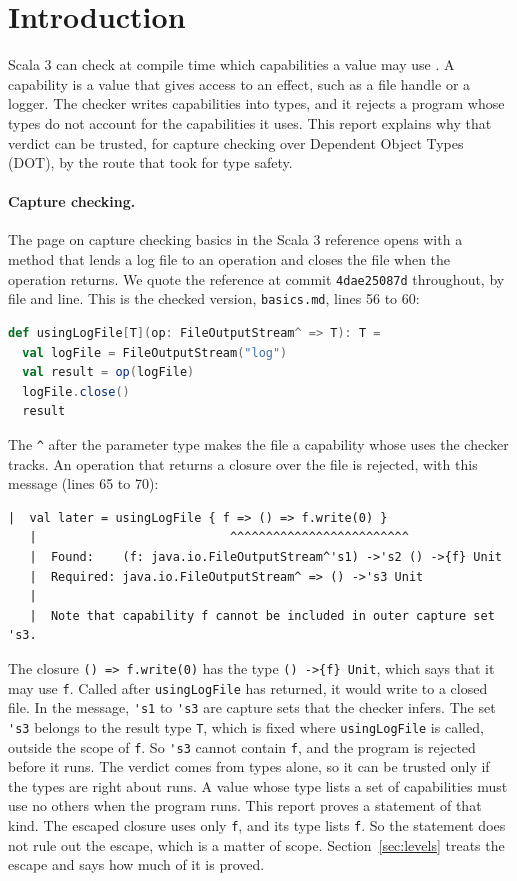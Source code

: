 \section{Introduction}\label{sec:intro}
\mathplain

Scala 3 can check at compile time which capabilities a value may use \cite{scala3cc,boruchgruszecki2023capturing}. A capability is a value that gives access to an effect, such as a file handle or a logger. The checker writes capabilities into types, and it rejects a program whose types do not account for the capabilities it uses. This report explains why that verdict can be trusted, for capture checking over Dependent Object Types (DOT), by the route that \Rone took for type safety.

\paragraph{Capture checking.}
The page on capture checking basics in the Scala 3 reference \cite{scala3cc} opens with a method that lends a log file to an operation and closes the file when the operation returns. We quote the reference at commit \texttt{4dae25087d} throughout, by file and line. This is the checked version, \texttt{basics.md}, lines 56 to 60:
\begin{lstlisting}[language=Scala]
def usingLogFile[T](op: FileOutputStream^ => T): T =
  val logFile = FileOutputStream("log")
  val result = op(logFile)
  logFile.close()
  result
\end{lstlisting}
The \lstinline|^| after the parameter type makes the file a capability whose uses the checker tracks. An operation that returns a closure over the file is rejected, with this message (lines 65 to 70):
\begin{lstlisting}[basicstyle=\ttfamily\footnotesize,columns=fixed,basewidth=0.52em]
   |  val later = usingLogFile { f => () => f.write(0) }
   |                           ^^^^^^^^^^^^^^^^^^^^^^^^^
   |  Found:    (f: java.io.FileOutputStream^'s1) ->'s2 () ->{f} Unit
   |  Required: java.io.FileOutputStream^ => () ->'s3 Unit
   |
   |  Note that capability f cannot be included in outer capture set 's3.
\end{lstlisting}
The closure \lstinline|() => f.write(0)| has the type \lstinline|() ->{f} Unit|, which says that it may use \lstinline|f|. Called after \lstinline|usingLogFile| has returned, it would write to a closed file. In the message, \lstinline|'s1| to \lstinline|'s3| are capture sets that the checker infers. The set \lstinline|'s3| belongs to the result type \lstinline|T|, which is fixed where \lstinline|usingLogFile| is called, outside the scope of \lstinline|f|. So \lstinline|'s3| cannot contain \lstinline|f|, and the program is rejected before it runs. The verdict comes from types alone, so it can be trusted only if the types are right about runs. A value whose type lists a set of capabilities must use no others when the program runs. This report proves a statement of that kind. The escaped closure uses only \lstinline|f|, and its type lists \lstinline|f|. So the statement does not rule out the escape, which is a matter of scope. Section~\ref{sec:levels} treats the escape and says how much of it is proved.

